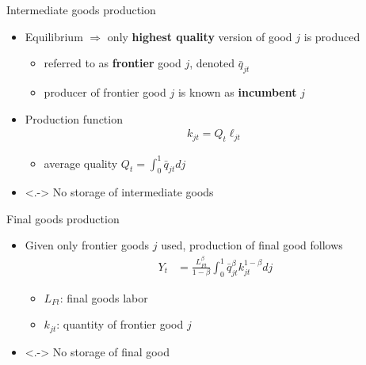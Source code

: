 \documentclass[english,usenames,dvipsnames,handout]{beamer}
\begin{document}
\begin{frame}{Intermediate goods production}\label{intermediate_goods_production}
	\begin{itemize}
		\item<+-> Equilibrium $\Rightarrow$ only \alert{\textbf{highest quality}} version of good $j$ is produced \hyperlink{two_stage_bertrand2}{}
		\begin{itemize}
			\item referred to as \alert{\textbf{frontier}} good $j$, denoted $\bar{q}_{jt}$
			\item producer of frontier good $j$ is known as  \alert{\textbf{incumbent}} $j$ 
		\end{itemize}
		\medskip
		\item<+-> Production function
		\begin{align*}
		k_{jt} = Q_t \ell_{jt}
		\end{align*}
		\begin{itemize}
			\item average quality $Q_t = \int_0^1 \bar{q}_{jt} dj$
		\end{itemize}
		\medskip
		\item<.-> No storage of intermediate goods 
	\end{itemize}
\end{frame}

\begin{frame}{Final goods production}\label{main:final_goods_production}
	\begin{itemize}
		\item<+-> Given only frontier goods $j$ used, production of final good follows
		\begin{align*}
		Y_t &= \frac{L_{Ft}^{\beta}}{1-\beta} \int_0^1 \bar{q}_{jt}^{\beta} k_{jt}^{1-\beta} dj 
		\end{align*}
		\begin{itemize}
			\item $L_{Ft}$: final goods labor
			\item $k_{jt}$: quantity of frontier good $j$
		\end{itemize} \hyperlink{definition:final_goods_production}{} 
		\smallskip
		\item<.-> No storage of final good
	\end{itemize}
\end{frame}
\end{document}
